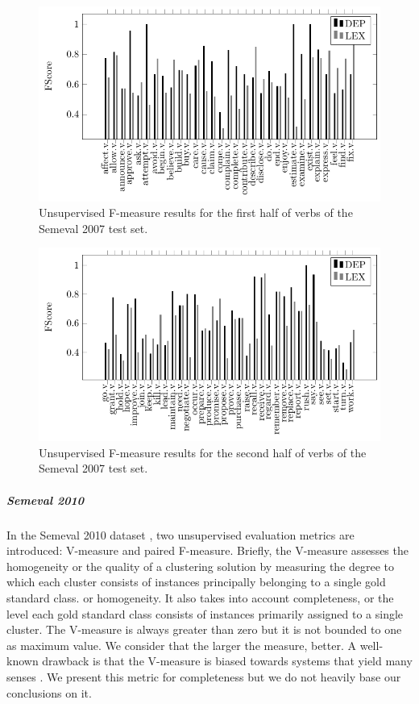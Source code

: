  \begin{figure}[!htb]
\centering
\includegraphics[width=1\linewidth]{images/Chapitre5/tex_img_files/verbs_fs_2.pdf}
\caption{Unsupervised F-measure results for the first half of verbs of the Semeval 2007 test set.}
\label{fig:verbs_fs2}
\end{figure}

 \begin{figure}[!htb]
\centering
\includegraphics[width=1\linewidth]{images/Chapitre5/tex_img_files/verbs_fs_3.pdf}
\caption{Unsupervised F-measure results for the second half of verbs of the Semeval 2007 test set.}
\label{fig:verbs_fs3}
\end{figure}



\subparagraph{Semeval 2010}
In the Semeval 2010 dataset \cite{Semeval2010}, two unsupervised evaluation metrics are introduced: {V-measure} and {paired F-measure}. Briefly, the V-measure assesses the homogeneity or the quality of a clustering solution by measuring the degree to which each cluster consists of instances principally belonging to a single gold standard class. or homogeneity. It also takes into account completeness, or the level each gold standard class consists of instances primarily assigned to a single cluster. The V-measure is always greater than zero but it is not bounded to one as maximum value. We consider that the larger the measure, better. A well-known drawback is that the V-measure  is biased towards systems that yield many senses \cite{Semeval2010,VandeCruys2011,pedersen2010duluth}. We present this metric for completeness but we do not heavily base our conclusions on it.

